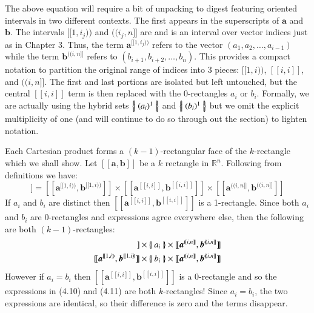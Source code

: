 The above equation will require a bit of unpacking to digest featuring oriented intervals in two different contexts.
The first appears in the superscripts of $\boldsymbol{a}$ and $\boldsymbol{b}$. 
The intervals $[\![1, i_j)\!)$ and $(\!(i_j, n]\!]$ are  and is an interval over vector indices just as in Chapter 3.
Thus, the term $\boldsymbol{a}^{[\![1,i_j)\!)}$ refers to the vector $(a_1, a_2, \ldots, a_{i-1})$ 
while the term $\boldsymbol{b}^{(\!(i,n]\!]}$ refers to $(b_{i+1}, b_{i+2}, \ldots, b_{n})$.
This provides a compact notation to partition the original range of indices into 3 pieces: $[\![ 1,i )\!)$, $[\![i, i]\!]$, and $(\!(i, n]\!]$.
The first and last portions are isolated but left untouched, 
but the central $[\![i,i]\!]$ term is then replaced with the 0-rectangles $a_i$ or $b_i$.
Formally, we are actually using the hybrid sets $\left\{ \! \left| \; (a_i)^1 \; \right| \! \right\}$ and $\left\{ \! \left| \; (b_i)^1 \; \right| \! \right\}$ but we omit the explicit multiplicity of one (and will continue to do so through out the section) to lighten notation.

Each Cartesian product forms a $(k-1)$-rectangular face of the $k$-rectangle which we shall show.
Let $[\![ \boldsymbol{a}, \boldsymbol{b} ]\!]$ be a $k$ rectangle in $\mathbb{R}^n$.
Following from definitions we have:
\begin{equation}
	[\![ \boldsymbol{a}, \boldsymbol{b} ]\!] = 
		[\![\boldsymbol{a}^{[\![1,i)\!)}, \boldsymbol{b}^{[\![1,i)\!)} ]\!] \times 
		[\![\boldsymbol{a}^{[\![i,i]\!]}, \boldsymbol{b}^{[\![i,i]\!]} ]\!] \times
		[\![\boldsymbol{a}^{(\!(i,n]\!]}, \boldsymbol{b}^{(\!(i,n]\!]} ]\!]
\end{equation}
If $a_i$ and $b_i$ are distinct then $[\![\boldsymbol{a}^{[\![i,i]\!]}, \boldsymbol{b}^{[\![i,i]\!]} ]\!]$ is a 1-rectangle.
Since both $a_i$ and $b_i$ are 0-rectangles and expressions agree everywhere else, then the following are both $(k-1)$-rectangles:
\begin{align}
	[\![\boldsymbol{a}^{[\![1,i)\!)}, \boldsymbol{b}^{[\![1,i)\!)} ]\!]
	\times \hset{a_i} \times
	[\![\boldsymbol{a}^{(\!(i,n]\!]}, \boldsymbol{b}^{(\!(i,n]\!]} ]\!]
	\\
	[\![\boldsymbol{a}^{[\![1,i)\!)}, \boldsymbol{b}^{[\![1,i)\!)} ]\!]
	\times \hset{b_i} \times
	[\![\boldsymbol{a}^{(\!(i,n]\!]}, \boldsymbol{b}^{(\!(i,n]\!]} ]\!]
\end{align}
However if $a_i = b_i$ then $[\![\boldsymbol{a}^{[\![i,i]\!]}, \boldsymbol{b}^{[\![i,i]\!]} ]\!]$ is a 0-rectangle and so the expressions in (4.10) and (4.11) are both $k$-rectangles!
Since $a_i = b_i$, the two expressions are identical, so their difference is zero and the terms disappear.

